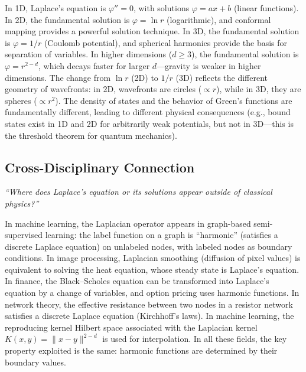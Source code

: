 In 1D, Laplace's equation is $\varphi'' = 0$, with solutions $\varphi = ax + b$ (linear functions). In 2D, the fundamental solution is $\varphi = \ln r$ (logarithmic), and conformal mapping provides a powerful solution technique. In 3D, the fundamental solution is $\varphi = 1/r$ (Coulomb potential), and spherical harmonics provide the basis for separation of variables. In higher dimensions ($d \geq 3$), the fundamental solution is $\varphi = r^{2-d}$, which decays faster for larger $d$---gravity is weaker in higher dimensions. The change from $\ln r$ (2D) to $1/r$ (3D) reflects the different geometry of wavefronts: in 2D, wavefronts are circles ($\propto r$), while in 3D, they are spheres ($\propto r^{2}$). The density of states and the behavior of Green's functions are fundamentally different, leading to different physical consequences (e.g., bound states exist in 1D and 2D for arbitrarily weak potentials, but not in 3D---this is the threshold theorem for quantum mechanics).

\subsection*{Cross-Disciplinary Connection}
\textit{``Where does Laplace's equation or its solutions appear outside of classical physics?''}

In machine learning, the Laplacian operator appears in graph-based semi-supervised learning: the label function on a graph is ``harmonic'' (satisfies a discrete Laplace equation) on unlabeled nodes, with labeled nodes as boundary conditions. In image processing, Laplacian smoothing (diffusion of pixel values) is equivalent to solving the heat equation, whose steady state is Laplace's equation. In finance, the Black--Scholes equation can be transformed into Laplace's equation by a change of variables, and option pricing uses harmonic functions. In network theory, the effective resistance between two nodes in a resistor network satisfies a discrete Laplace equation (Kirchhoff's laws). In machine learning, the reproducing kernel Hilbert space associated with the Laplacian kernel $K(x,y) = \|x-y\|^{2-d}$ is used for interpolation. In all these fields, the key property exploited is the same: harmonic functions are determined by their boundary values.



